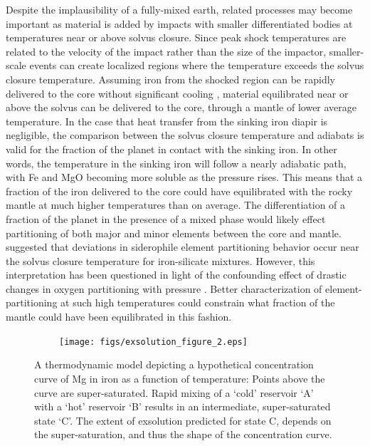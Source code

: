 Despite the implausibility of a fully-mixed earth, related processes may become important
as material is added by impacts with smaller differentiated bodies at temperatures near
or above solvus closure. Since peak shock temperatures are related to the velocity of the
impact rather than the size of the impactor, smaller-scale events can create localized
regions where the temperature exceeds the solvus closure temperature.  Assuming iron from
the shocked region can be rapidly delivered to the core without significant cooling
\citep{Monteux2009}, material equilibrated near or above the solvus can be delivered to
the core, through a mantle of lower average temperature. In the case that heat transfer
from the sinking iron diapir is negligible, the comparison between the solvus closure
temperature and adiabats is valid for the fraction of the planet in contact with the
sinking iron. In other words, the temperature in the sinking iron will follow a nearly
adiabatic path, with Fe and MgO becoming more soluble as the pressure rises. This means
that a fraction of the iron delivered to the core could have equilibrated with the rocky
mantle at much higher temperatures than on average. The differentiation of a fraction of
the planet in the presence of a mixed phase would likely effect partitioning of both major
and minor elements between the core and mantle. \cite{Walker1993}
suggested that deviations in siderophile element partitioning behavior occur near the
solvus closure temperature for iron-silicate mixtures. However, this interpretation has
been questioned in light of the confounding effect of drastic changes in oxygen partitioning
with pressure \citep{Frost2010}. Better characterization of element-partitioning at such
high temperatures could constrain what fraction of the mantle could have been
equilibrated in this fashion.


\begin{figure}[h!]  
  \centering
    \texttt{[image: figs/exsolution\_figure\_2.eps]}  
\caption{ A thermodynamic model depicting a hypothetical concentration curve of Mg in
    iron as a function of temperature: Points above the curve are super-saturated.
    Rapid mixing of a ‘cold’ reservoir ‘A’ with a ‘hot’ reservoir ‘B’ results in an
    intermediate, super-saturated state ‘C’. The extent of exsolution predicted for
    state C, depends on the super-saturation, and thus the shape of the concentration
    curve. 
}
\label{fig:exsolution}
\end{figure}


